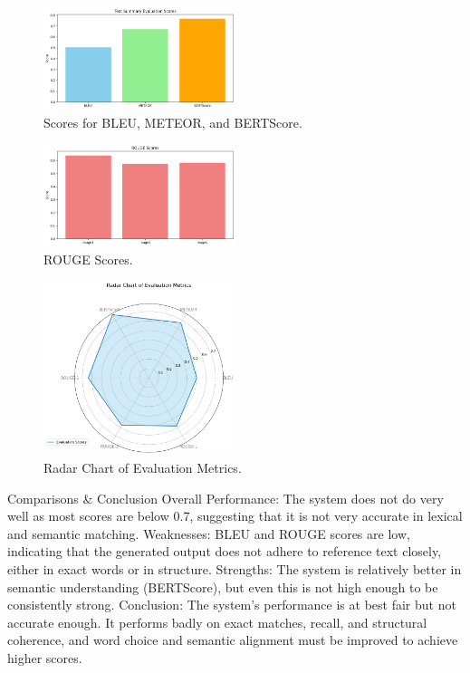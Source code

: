 \begin{figure}[h!]
    \centering
    \includegraphics[width=0.5\textwidth]{fig/F1.png}
    \caption{Scores for BLEU, METEOR, and BERTScore.}
    \label{fig:f1}
\end{figure}

\begin{figure}[h!]
    \centering
    \includegraphics[width=0.5\textwidth]{fig/F2.png}
    \caption{ROUGE Scores.}
    \label{fig:f2}
\end{figure}

\begin{figure}[h!]
    \centering
    \includegraphics[width=0.5\textwidth]{fig/F3.png}
    \caption{Radar Chart of Evaluation Metrics.}
    \label{fig:f3}
\end{figure}
Comparisons \& Conclusion
Overall Performance: The system does not do very well as most scores are below 0.7, suggesting that it is not very accurate in lexical and semantic matching.
Weaknesses: BLEU and ROUGE scores are low, indicating that the generated output does not adhere to reference text closely, either in exact words or in structure.
Strengths: The system is relatively better in semantic understanding (BERTScore), but even this is not high enough to be consistently strong.
Conclusion: The system's performance is at best fair but not accurate enough. It performs badly on exact matches, recall, and structural coherence, and word choice and semantic alignment must be improved to achieve higher scores.